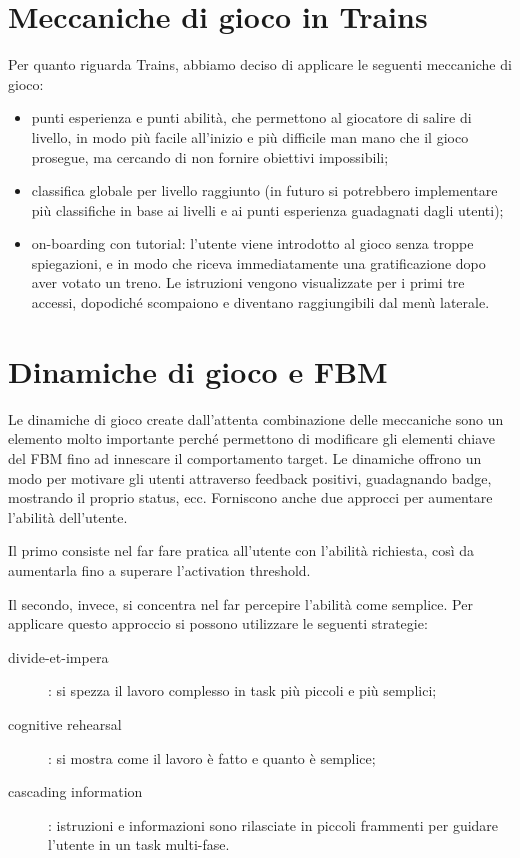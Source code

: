 \section{Meccaniche di gioco in Trains\label{sec:meccaniche-app}}
Per quanto riguarda Trains, abbiamo deciso di applicare le seguenti meccaniche di gioco:
\begin{itemize}
    \item punti esperienza e punti abilità, che permettono al giocatore di salire di livello, in modo più facile all'inizio e più difficile man mano che il gioco prosegue, ma cercando di non fornire obiettivi impossibili;
    \item classifica globale per livello raggiunto (in futuro si potrebbero implementare più classifiche in base ai livelli e ai punti esperienza guadagnati dagli utenti);
    \item on-boarding con tutorial: l'utente viene introdotto al gioco senza troppe spiegazioni, e in modo che riceva immediatamente una gratificazione dopo aver votato un treno. Le istruzioni vengono visualizzate per i primi tre accessi, dopodiché scompaiono e diventano raggiungibili dal menù laterale.
\end{itemize}
\section{Dinamiche di gioco e FBM\label{sec:dinamiche-fbm}}

Le dinamiche di gioco create dall'attenta combinazione delle meccaniche sono un elemento molto importante perché permettono di modificare gli elementi chiave del FBM fino ad innescare il comportamento target.
Le dinamiche offrono un modo per motivare gli utenti attraverso feedback positivi, guadagnando badge, mostrando il proprio status, ecc. Forniscono anche due approcci per aumentare l'abilità dell'utente.

Il primo consiste nel far fare pratica all'utente con l'abilità richiesta, così da aumentarla fino a superare l'activation threshold.

Il secondo, invece, si concentra nel far percepire l'abilità come semplice. Per applicare questo  approccio si possono utilizzare le seguenti strategie:
\begin{description}
    \item[divide-et-impera]: si spezza il lavoro complesso in task più piccoli e più semplici;
    \item[cognitive rehearsal]: si mostra come il lavoro è fatto e quanto è semplice;
    \item[cascading information]: istruzioni e informazioni sono rilasciate in piccoli frammenti per guidare l'utente in un task multi-fase.
\end{description}

